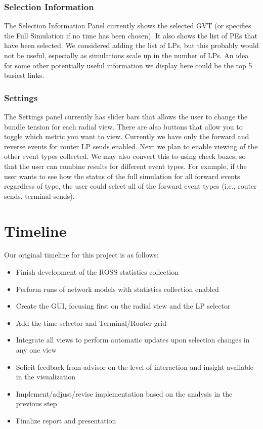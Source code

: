 \documentclass{acm_proc_article-sp}
\begin{document}
\subsubsection{Selection Information}
The Selection Information Panel currently shows the selected GVT (or specifies the Full Simulation if no time has been chosen).  It also shows the list of PEs that have been selected.  We considered adding the list of LPs, but this probably would not be useful, especially as simulations scale up in the number of LPs.  An idea for some other potentially useful information we  display here could be the top 5 busiest links.

\subsubsection{Settings}
The Settings panel currently has slider bars that allows the user to change the bundle tension for each radial view.  There are also buttons that allow you to toggle which metric you want to view.  Currently we have only the forward and reverse events for router LP sends enabled.  Next we plan to enable viewing of the other event types collected.  We may also convert this to using check boxes, so that the user can combine results for different event types.  For example, if the user wants to see how the status of the full simulation for all forward events regardless of type, the user could select all of the forward event types (i.e., router sends, terminal sends).  

\section{Timeline}
Our original timeline for this project is as follows:
\begin{itemize}
\item Finish development of the ROSS statistics collection
\item Perform runs of network models with statistics collection enabled
\item Create the GUI, focusing first on the radial view and the LP selector
\item Add the time selector and Terminal/Router grid
\item Integrate all views to perform automatic updates upon selection changes in any one view
\item Solicit feedback from advisor on the level of interaction and insight available in the visualization
\item Implement/adjust/revise implementation based on the analysis in the previous step
\item Finalize report and presentation
\end{itemize}
\end{document}
